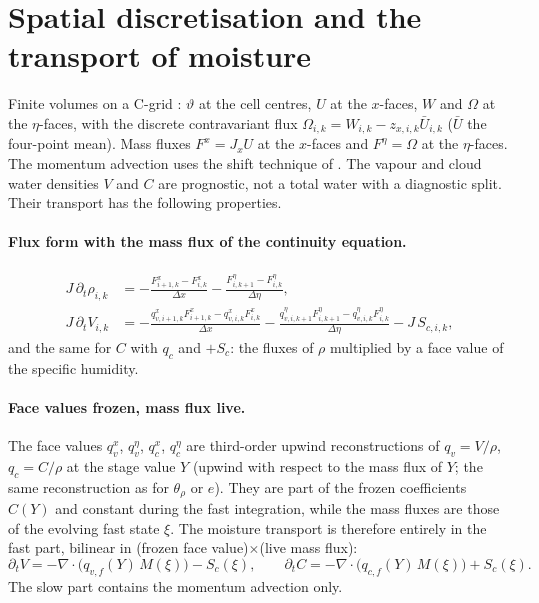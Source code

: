 \documentclass[11pt,a4paper]{article}
\newcommand{\tv}{\vartheta}   %
\newcommand{\fs}{\xi}         %
\begin{document}
\section{Spatial discretisation and the transport of moisture}\label{sec:moisture}
Finite volumes on a C-grid \cite{arakawa}: $\tv$ at the cell centres, $U$ at the $x$-faces, $W$ and
$\Omega$ at the $\eta$-faces, with the discrete contravariant flux $\Omega_{i,k}=W_{i,k}-z_{x,i,k}\bar U_{i,k}$
($\bar U$ the four-point mean). Mass fluxes $F^x=J_xU$ at the $x$-faces and $F^\eta=\Omega$ at the
$\eta$-faces. The momentum advection uses the shift technique of \cite{hicken}. The vapour and cloud
water densities $V$ and $C$ are prognostic, not a total water with a diagnostic split. Their transport
has the following properties.

\paragraph{Flux form with the mass flux of the continuity equation.}
\begin{align*}
J\,\partial_t\rho_{i,k}&=-\frac{F^x_{i+1,k}-F^x_{i,k}}{\Delta x}-\frac{F^\eta_{i,k+1}-F^\eta_{i,k}}{\Delta\eta},\\
J\,\partial_tV_{i,k}&=-\frac{q^x_{v,i+1,k}F^x_{i+1,k}-q^x_{v,i,k}F^x_{i,k}}{\Delta x}
-\frac{q^\eta_{v,i,k+1}F^\eta_{i,k+1}-q^\eta_{v,i,k}F^\eta_{i,k}}{\Delta\eta}-J\,S_{c,i,k},
\end{align*}
and the same for $C$ with $q_c$ and $+S_c$: the fluxes of $\rho$ multiplied by a face value of the
specific humidity.

\paragraph{Face values frozen, mass flux live.} The face values $q^x_v$, $q^\eta_v$, $q^x_c$, $q^\eta_c$ are
third-order upwind reconstructions of $q_v=V/\rho$, $q_c=C/\rho$ at the stage value $Y$ (upwind with
respect to the mass flux of $Y$; the same reconstruction as for $\theta_\rho$ or $e$). They are part of the
frozen coefficients $C(Y)$ and constant during the fast integration, while the mass fluxes are those
of the evolving fast state $\fs$. The moisture transport is therefore entirely in the fast part,
bilinear in (frozen face value)$\times$(live mass flux):
\[
\partial_tV=-\nabla\cdot\big(q_{v,f}(Y)\,M(\fs)\big)-S_c(\fs),\qquad\partial_tC=-\nabla\cdot\big(q_{c,f}(Y)\,M(\fs)\big)+S_c(\fs).
\]
The slow part contains the momentum advection only.
\end{document}
